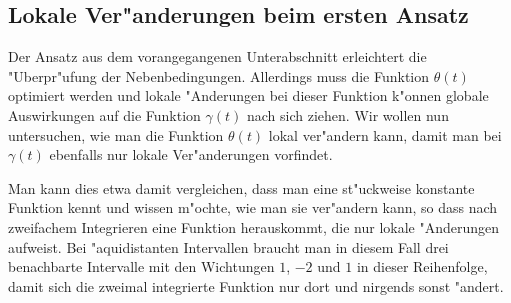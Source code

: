 \documentclass[a4paper]{scrartcl}
\begin{document}
\subsection{Lokale Ver"anderungen beim ersten Ansatz}

Der Ansatz aus dem vorangegangenen Unterabschnitt erleichtert die "Uberpr"ufung der Nebenbedingungen. 
Allerdings muss die Funktion $\theta(t)$ optimiert werden und lokale "Anderungen bei dieser Funktion k"onnen globale Auswirkungen auf die Funktion $\gamma(t)$ nach sich ziehen. 
Wir wollen nun untersuchen, wie man die Funktion $\theta(t)$ lokal ver"andern kann, damit man bei $\gamma(t)$ ebenfalls nur lokale Ver"anderungen vorfindet. 

Man kann dies etwa damit vergleichen, dass man eine st"uckweise konstante Funktion kennt und wissen m"ochte, wie man sie ver"andern kann, so dass nach zweifachem Integrieren eine Funktion herauskommt, die nur lokale "Anderungen aufweist. 
Bei "aquidistanten Intervallen braucht man in diesem Fall drei benachbarte Intervalle mit den Wichtungen $1$, $-2$ und $1$ in dieser Reihenfolge, damit sich die zweimal integrierte Funktion nur dort und nirgends sonst "andert. 
\end{document}
